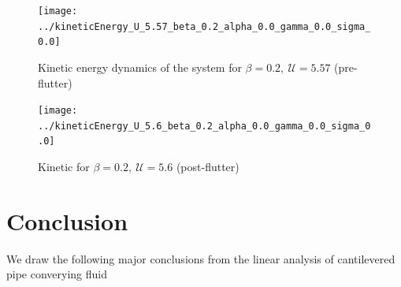 \documentclass[12pt]{report}
\begin{document}
\begin{figure}[h!]
	\centering
	\texttt{[image: ../kineticEnergy\_U\_5.57\_beta\_0.2\_alpha\_0.0\_gamma\_0.0\_sigma\_0.0]}
	\caption{Kinetic energy dynamics of the system for $\beta = 0.2, ~\mathcal{U} = 5.57$ (pre-flutter)}
	\label{fig:energy-U-5p57-beta-0p2}
\end{figure}

\begin{figure}[h!]
	\centering
	\texttt{[image: ../kineticEnergy\_U\_5.6\_beta\_0.2\_alpha\_0.0\_gamma\_0.0\_sigma\_0.0]}
	\caption{Kinetic for $\beta = 0.2, ~\mathcal{U} = 5.6$ (post-flutter)}
	\label{fig:energy-U-5p6-beta-0p2}
\end{figure}





\chapter{Conclusion} \label{chap:5}
We draw the following major conclusions from the linear analysis of cantilevered pipe converying fluid
\end{document}
